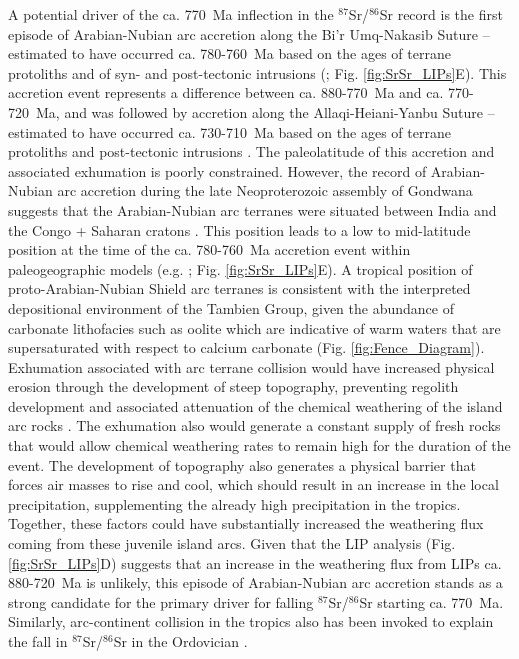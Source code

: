 \documentclass[11pt,letterpaper]{article}
\newcommand{\SrSr}{$^{87}$Sr/$^{86}$Sr\xspace}
\begin{document}
A potential driver of the ca. 770~Ma inflection in the \SrSr record is the first episode of Arabian-Nubian arc accretion along the Bi'r Umq-Nakasib Suture -- estimated to have occurred ca. 780-760~Ma based on the ages of terrane protoliths and of syn- and post-tectonic intrusions (\citealp{Pallister1988a, Johnson2003a, Johnson2003b, Johnson2014a}; Fig. \ref{fig:SrSr_LIPs}E). This accretion event represents a difference between ca. 880-770~Ma and ca. 770-720~Ma, and was followed by accretion along the Allaqi-Heiani-Yanbu Suture -- estimated to have occurred ca. 730-710~Ma based on the ages of terrane protoliths and post-tectonic intrusions \citep{Ali2010a, Johnson2014a, Kozdroj2017a}. The paleolatitude of this accretion and associated exhumation is poorly constrained. However, the record of Arabian-Nubian arc accretion during the late Neoproterozoic assembly of Gondwana suggests that the Arabian-Nubian arc terranes were situated between India and the Congo + Saharan cratons \citep{Li2008a, Hoffman2009a}. This position leads to a low to mid-latitude position at the time of the ca. 780-760~Ma accretion event within paleogeographic models (e.g. \citealp{Li2008a, Swanson-Hysell2018a}; Fig. \ref{fig:SrSr_LIPs}E). A tropical position of proto-Arabian-Nubian Shield arc terranes is consistent with the interpreted depositional environment of the Tambien Group, given the abundance of carbonate lithofacies such as oolite which are indicative of warm waters that are supersaturated with respect to calcium carbonate (Fig. \ref{fig:Fence_Diagram}). Exhumation associated with arc terrane collision would have increased physical erosion through the development of steep topography, preventing regolith development and associated attenuation of the chemical weathering of the island arc rocks \citep{Gabet2009a}. The exhumation also would generate a constant supply of fresh rocks that would allow chemical weathering rates to remain high for the duration of the event. The development of topography also generates a physical barrier that forces air masses to rise and cool, which should result in an increase in the local precipitation, supplementing the already high precipitation in the tropics. Together, these factors could have substantially increased the weathering flux coming from these juvenile island arcs. Given that the LIP analysis (Fig. \ref{fig:SrSr_LIPs}D) suggests that an increase in the weathering flux from LIPs ca. 880-720~Ma is unlikely, this episode of Arabian-Nubian arc accretion stands as a strong candidate for the primary driver for falling \SrSr starting ca. 770~Ma. Similarly, arc-continent collision in the tropics also has been invoked to explain the fall in \SrSr in the Ordovician \citep{Swanson-Hysell2017a}.
\end{document}
